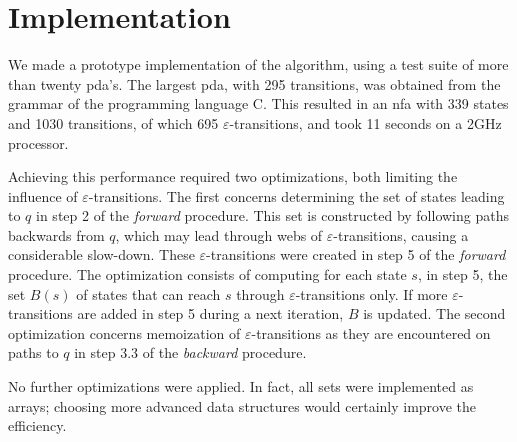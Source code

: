 \documentclass{llncs}
\newcommand{\eps}{\ensuremath{\varepsilon}}
\begin{document}
\section{Implementation}

We made a prototype implementation of the algorithm, using a test suite of more than twenty pda's.
The largest pda, with 295 transitions, was obtained from the grammar of the programming language C.
This resulted in an nfa with 339 states and 1030 transitions, of which 695 $\eps$-transitions,
and took 11 seconds on a 2GHz processor.

Achieving this performance required two optimizations, both limiting
the influence of $\eps$-transitions.
The first concerns determining the set of states leading to $q$ in
step 2 of the {\em forward} procedure.
This set is constructed by following paths backwards from $q$,
which may lead through webs of $\eps$-transitions, causing a considerable slow-down.
These $\eps$-transitions were created in step 5 of the {\em forward} procedure.
The optimization consists of computing for each state $s$, in step 5,
the set $B(s)$ of states that can reach $s$ through $\eps$-transitions only.
If more $\eps$-transitions are added in step 5 during a next iteration, $B$ is updated.
The second optimization concerns memoization of $\eps$-transitions as they are encountered
on paths to $q$ in step 3.3 of the {\em backward} procedure.


No further optimizations were applied. In fact, all sets were implemented as arrays;
choosing more advanced data structures would certainly improve the efficiency.












\end{document}

